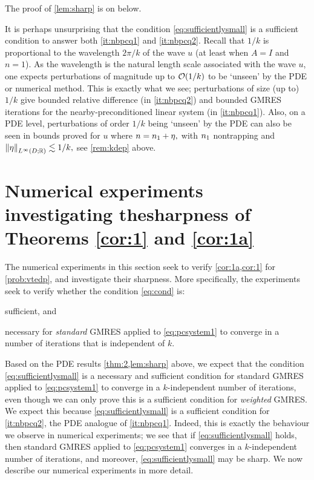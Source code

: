 The proof of \cref{lem:sharp} is on  below.

\label{rem:physical1k}
It is perhaps unsurprising that the condition \cref{eq:sufficientlysmall} is a sufficient condition to answer both \cref{it:nbpcq1} and \cref{it:nbpcq2}. Recall that $1/k$ is proportional to the wavelength $2\pi/k$ of the wave $u$ (at least when $A=I$ and $n=1$). As the wavelength is the natural length scale associated with the wave $u$, one expects perturbations of magnitude up to $\mathcal O(1/k)$ to be `unseen' by the PDE or numerical method. This is exactly what we see; perturbations of size (up to) $1/k$ give bounded relative difference (in \cref{it:nbpcq2}) and bounded GMRES iterations for the nearby-preconditioned linear system (in \cref{it:nbpcq1}). Also, on a PDE level, perturbations of order $1/k$ being `unseen' by the PDE can also be seen in bounds proved for $u$ where $n = n_{1} + \eta,$ with $n_{1}$ nontrapping and $\NLiDRR{\eta} \lesssim 1/k,$ see \cref{rem:kdep} above.
\ere


\section[Numerical experiments investigating sharpness]{Numerical experiments investigating the\newline sharpness of Theorems {\ref{cor:1}} and {\ref{cor:1a}}}\label{sec:num}

The numerical experiments in this section seek to verify \cref{cor:1a,cor:1} for \cref{prob:vtedp}, and investigate their sharpness. More specifically, the experiments seek to verify whether the condition \cref{eq:cond} is:
\ben
\item sufficient, and
\item necessary
  \een
  for \emph{standard} GMRES applied to \cref{eq:pcsystem1} to converge in a number of iterations that is independent of $k.$

Based on the PDE results \cref{thm:2,lem:sharp} above, we expect that the condition \cref{eq:sufficientlysmall} is a necessary and sufficient condition for standard GMRES applied to \cref{eq:pcsystem1} to converge in a $k$-independent number of iterations, even though we can only prove this is a sufficient condition for \emph{weighted} GMRES. We expect this because \cref{eq:sufficientlysmall} is a sufficient condition for \cref{it:nbpcq2}, the PDE analogue of \cref{it:nbpcq1}. Indeed, this is exactly the behaviour we observe in numerical experiments; we see that if \cref{eq:sufficientlysmall} holds, then standard GMRES applied to \cref{eq:pcsystem1} converges in a $k$-independent number of iterations, and moreover, \cref{eq:sufficientlysmall} may be sharp. We now describe our numerical experiments in more detail.

